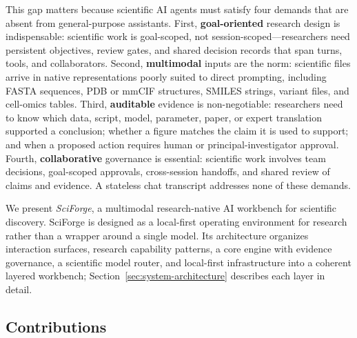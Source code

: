 \documentclass[sn-basic,Numbered,pdflatex]{sn-jnl}
\begin{document}
This gap matters because scientific AI agents must satisfy four demands that are absent from general-purpose assistants. First, \textbf{goal-oriented} research design is indispensable: scientific work is goal-scoped, not session-scoped—researchers need persistent objectives, review gates, and shared decision records that span turns, tools, and collaborators. Second, \textbf{multimodal} inputs are the norm: scientific files arrive in native representations poorly suited to direct prompting, including FASTA sequences, PDB or mmCIF structures, SMILES strings, variant files, and cell-omics tables. Third, \textbf{auditable} evidence is non-negotiable: researchers need to know which data, script, model, parameter, paper, or expert translation supported a conclusion; whether a figure matches the claim it is used to support; and when a proposed action requires human or principal-investigator approval. Fourth, \textbf{collaborative} governance is essential: scientific work involves team decisions, goal-scoped approvals, cross-session handoffs, and shared review of claims and evidence. A stateless chat transcript addresses none of these demands.

We present \emph{SciForge}, a multimodal research-native AI workbench for scientific discovery. SciForge is designed as a local-first operating environment for research rather than a wrapper around a single model. Its architecture organizes interaction surfaces, research capability patterns, a core engine with evidence governance, a scientific model router, and local-first infrastructure into a coherent layered workbench; Section~\ref{sec:system-architecture} describes each layer in detail.

\subsection{Contributions}
\end{document}
